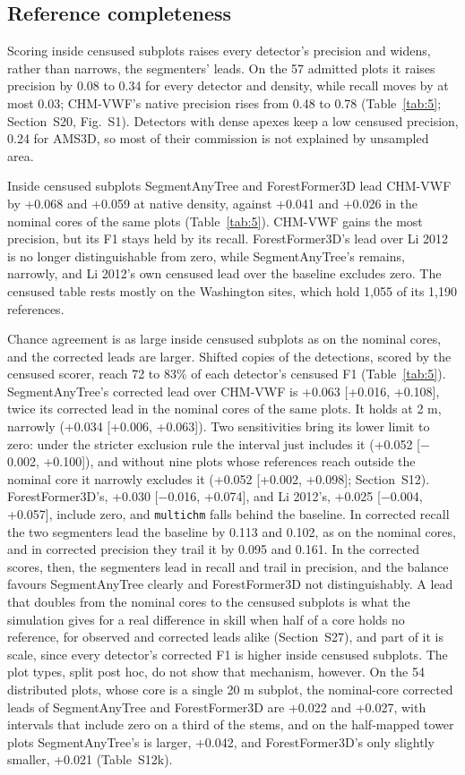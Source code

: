 \documentclass[preprint,12pt,authoryear,a4paper]{elsarticle}
\begin{document}
\subsection{Reference completeness}\label{sec:5.5}

Scoring inside censused subplots raises every detector's precision and widens,
rather than narrows, the segmenters' leads. On the 57 admitted plots it raises
precision by 0.08 to 0.34 for every detector and density, while recall moves by
at most 0.03; CHM-VWF's native precision rises from 0.48 to 0.78 (Table~\ref{tab:5};
Section~S20, Fig.~S1). Detectors with dense apexes keep a low censused
precision, 0.24 for AMS3D, so most of their commission is not explained by
unsampled area.

Inside censused subplots SegmentAnyTree and ForestFormer3D lead CHM-VWF by
+0.068 and +0.059 at native density, against +0.041 and +0.026 in the nominal
cores of the same plots (Table~\ref{tab:5}). CHM-VWF gains the most precision, but its F1
stays held by its recall. ForestFormer3D's lead over Li 2012 is no longer
distinguishable from zero, while SegmentAnyTree's remains, narrowly, and Li
2012's own censused lead over the baseline excludes zero. The censused table
rests mostly on the Washington sites, which hold 1,055 of its 1,190 references.

Chance agreement is as large inside censused subplots as on the nominal cores,
and the corrected leads are larger. Shifted copies of the detections, scored by
the censused scorer, reach 72 to 83\% of each detector's censused F1 (Table~\ref{tab:5}).
SegmentAnyTree's corrected lead over CHM-VWF is +0.063 [+0.016, +0.108], twice
its corrected lead in the nominal cores of the same plots. It holds at 2 m,
narrowly (+0.034 [+0.006, +0.063]). Two sensitivities bring its lower limit to
zero: under the stricter exclusion rule the interval just includes it (+0.052
[$-$0.002, +0.100]), and without nine plots whose references reach outside the
nominal core it narrowly excludes it (+0.052 [+0.002, +0.098]; Section~S12).
ForestFormer3D's, +0.030 [$-$0.016, +0.074], and Li 2012's, +0.025 [$-$0.004,
+0.057], include zero, and \texttt{multichm} falls behind the baseline. In corrected
recall the two segmenters lead the baseline by 0.113 and 0.102, as on the
nominal cores, and in corrected precision they trail it by 0.095 and 0.161. In
the corrected scores, then, the segmenters lead in recall and trail in
precision, and the balance favours SegmentAnyTree clearly and ForestFormer3D not
distinguishably. A lead that doubles from the nominal cores to the censused
subplots is what the simulation gives for a real difference in skill when half
of a core holds no reference, for observed and corrected leads alike (Section~S27), and part of it is scale, since every detector's corrected F1 is higher
inside censused subplots. The plot types, split post hoc, do not show that
mechanism, however. On the 54 distributed plots, whose core is a single 20 m
subplot, the nominal-core corrected leads of SegmentAnyTree and ForestFormer3D
are +0.022 and +0.027, with intervals that include zero on a third of the stems,
and on the half-mapped tower plots SegmentAnyTree's is larger, +0.042, and
ForestFormer3D's only slightly smaller, +0.021 (Table~S12k).
\end{document}
